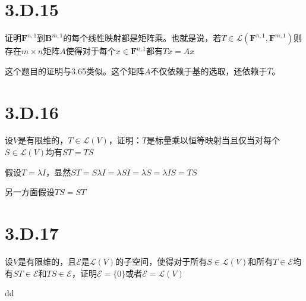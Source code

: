 \documentclass[10pt,a4paper,UTF8]{article}
\begin{document}
\section{3.D.15}
\label{sec:org52eb161}


\begin{problem}
证明\(\mathbf{F}^{n,1}\)到\(\mathbf{B}^{m,1}\)的每个线性映射都是矩阵乘。也就是说，若\(T\in \mathcal{L}(\mathbf{F}^{n,1}, \mathbf{F}^{m,1})\)则存在\(m\times n\)矩阵\(A\)使得对于每个\(x\in \mathbf{F}^{n,1}\)都有\(Tx = Ax\)
\end{problem}

\begin{answer}
这个题目的证明与3.65类似。这个矩阵\(A\)不仅依赖于基的选取，还依赖于\(T\)。
\end{answer}

\section{3.D.16}
\label{sec:org1f770db}


\begin{problem}
设\(V\)是有限维的，\(T\in \mathcal{L}(V)\)，证明：\(T\)是标量乘以恒等映射当且仅当对每个\(S\in \mathcal{L}(V)\)均有\(ST = TS\)
\end{problem}

\begin{answer}
假设\(T = \lambda I\)，显然\(ST = S\lambda I =  \lambda SI = \lambda S = \lambda I S = TS\)

另一方面假设\(TS = ST\)
\end{answer}

\section{3.D.17}
\label{sec:org49cfe25}


\begin{problem}
设\(V\)是有限维的，且\(\mathcal{E}\)是\(\mathcal{L}(V)\)的子空间，使得对于所有\(S\in \mathcal{L}(V)\)和所有\(T\in \mathcal{E}\)均有\(ST\in \mathcal{E}\)和\(TS\in \mathcal{E}\)，证明\(\mathcal{E} =\{0\}\)或者\(\mathcal{E} = \mathcal{L}(V)\)
\end{problem}

\begin{answer}
dd
\end{answer}
\end{document}
